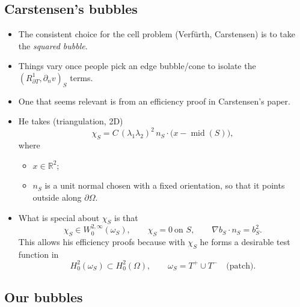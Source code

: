 \documentclass[12pt,a4paper]{article}
\newcommand{\dn}{\partial_n}
\newcommand{\midS}{\operatorname{mid}(S)}
\newcommand{\Rone}{R_{\partial T}^{1}}
\begin{document}
\subsection{Carstensen's bubbles}

\begin{itemize}
    \item The consistent choice for the cell problem (Verf\"urth, Carstensen) is to take the \emph{squared bubble}.

    \item Things vary once people pick an edge bubble/cone to isolate the
    $(\Rone,\dn v)_S$ terms.

    \item One that seems relevant is from an efficiency proof in Carstensen's paper.

    \item He takes (triangulation, 2D)
    \begin{equation}
        \chi_S=C\,(\lambda_1\lambda_2)^2\,
                n_S\cdot\bigl(x-\midS\bigr),
    \end{equation}
    where
    \begin{itemize}
        \item $x\in\mathbb{R}^2$;
        \item $n_S$ is a unit normal chosen with a fixed orientation, so that it points outside along $\partial\Omega$.
    \end{itemize}

    \item What is special about $\chi_S$ is that
    \begin{equation}
        \chi_S\in W_0^{2,\infty}(\omega_S),\qquad
        \chi_S=0\ \text{on }S,\qquad
        \nabla b_S\cdot n_S=b_S^2.
    \end{equation}
    This allows his efficiency proofs because with $\chi_S$ he forms a desirable test function in
    \begin{equation}
        H_0^2(\omega_S)\subset H_0^2(\Omega),
        \qquad \omega_S=T^+\cup T^-\quad\text{(patch)}.
    \end{equation}
\end{itemize}

\subsection{Our bubbles}
\end{document}
